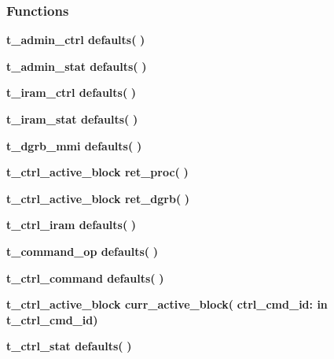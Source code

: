 \subsubsection*{Functions}
 \begin{DoxyCompactItemize}
\item 
{\bfseries {\bfseries \textcolor{vhdlchar}{t\+\_\+admin\+\_\+ctrl}\textcolor{vhdlchar}{ }}} {\bf defaults}{\bfseries  ( }{\bfseries  )} 
\item 
{\bfseries {\bfseries \textcolor{vhdlchar}{t\+\_\+admin\+\_\+stat}\textcolor{vhdlchar}{ }}} {\bf defaults}{\bfseries  ( }{\bfseries  )} 
\item 
{\bfseries {\bfseries \textcolor{vhdlchar}{t\+\_\+iram\+\_\+ctrl}\textcolor{vhdlchar}{ }}} {\bf defaults}{\bfseries  ( }{\bfseries  )} 
\item 
{\bfseries {\bfseries \textcolor{vhdlchar}{t\+\_\+iram\+\_\+stat}\textcolor{vhdlchar}{ }}} {\bf defaults}{\bfseries  ( }{\bfseries  )} 
\item 
{\bfseries {\bfseries \textcolor{vhdlchar}{t\+\_\+dgrb\+\_\+mmi}\textcolor{vhdlchar}{ }}} {\bf defaults}{\bfseries  ( }{\bfseries  )} 
\item 
{\bfseries {\bfseries \textcolor{vhdlchar}{t\+\_\+ctrl\+\_\+active\+\_\+block}\textcolor{vhdlchar}{ }}} {\bf ret\+\_\+proc}{\bfseries  ( }{\bfseries  )} 
\item 
{\bfseries {\bfseries \textcolor{vhdlchar}{t\+\_\+ctrl\+\_\+active\+\_\+block}\textcolor{vhdlchar}{ }}} {\bf ret\+\_\+dgrb}{\bfseries  ( }{\bfseries  )} 
\item 
{\bfseries {\bfseries \textcolor{vhdlchar}{t\+\_\+ctrl\+\_\+iram}\textcolor{vhdlchar}{ }}} {\bf defaults}{\bfseries  ( }{\bfseries  )} 
\item 
{\bfseries {\bfseries \textcolor{vhdlchar}{t\+\_\+command\+\_\+op}\textcolor{vhdlchar}{ }}} {\bf defaults}{\bfseries  ( }{\bfseries  )} 
\item 
{\bfseries {\bfseries \textcolor{vhdlchar}{t\+\_\+ctrl\+\_\+command}\textcolor{vhdlchar}{ }}} {\bf defaults}{\bfseries  ( }{\bfseries  )} 
\item 
{\bfseries {\bfseries \textcolor{vhdlchar}{t\+\_\+ctrl\+\_\+active\+\_\+block}\textcolor{vhdlchar}{ }}} {\bf curr\+\_\+active\+\_\+block}{\bfseries  ( }{\bfseries \textcolor{vhdlchar}{ctrl\+\_\+cmd\+\_\+id\+: }\textcolor{stringliteral}{in }\textcolor{vhdlchar}{t\+\_\+ctrl\+\_\+cmd\+\_\+id}}{\bfseries  )} 
\item 
{\bfseries {\bfseries \textcolor{vhdlchar}{t\+\_\+ctrl\+\_\+stat}\textcolor{vhdlchar}{ }}} {\bf defaults}{\bfseries  ( }{\bfseries  )} 

\end{DoxyCompactItemize}
